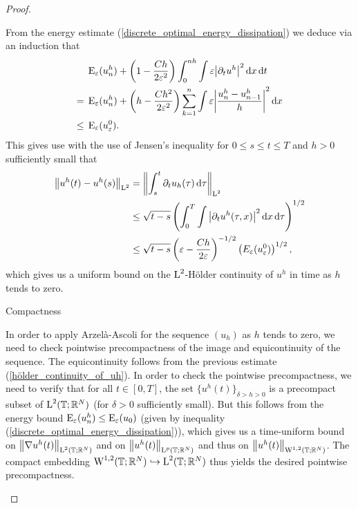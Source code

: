 \begin{proof}
\begin{description}[wide=0pt]
	From the energy estimate (\ref{discrete_optimal_energy_dissipation}) we deduce via an induction that
	\begin{align}
		& \operatorname{E}_{ \varepsilon } ( u_{ n }^{ h } )
		+
		\left(
			1
			-
			\frac{ C h  }{ 2 \varepsilon^{ 2 } }
		\right)
		\int_{ 0 }^{ n h }
			\int
				\varepsilon
				\abs{ \partial_{ t } u^{ h } }^{ 2 }
			\dd{ x }
		\dd{ t }
		\notag
		\\
		={} &
		\operatorname{E}_{ \varepsilon } ( u_{ n }^{ h } )
		+
		\left(
			h - \frac{ C h^{ 2 }}{ 2 \varepsilon^{ 2 } }
		\right)
		\sum_{k = 1 }^{ n }
			\int
				\varepsilon
				\abs{
				 	\frac{ u_{ n }^{ h } - u_{ n - 1 }^{ h } }{ h }
			 	}^{ 2 }
		 	\dd{ x }
		 \notag
		\\
		\label{energy_and_time_derivative_bound}
		\leq {} &
		\operatorname{E}_{ \varepsilon } ( u_{ \varepsilon }^{ 0 } ).
	\end{align}
	This gives use with the use of Jensen's inequality for $ 0\leq s \leq t \leq T $ and $ h > 0 $ sufficiently small that
	\begin{align}
		\norm{ u^{ h } ( t ) - u^{ h } ( s ) }_{ \operatorname{L}^{ 2 } }
		& =
		\norm{ 
			\int_{ s }^{ t }
				\partial_{ t } u_{ h } ( \tau )
			\dd{ \tau }
		}_{ \operatorname{L}^{ 2 } }
		\notag
		\\
		& \leq
		\sqrt{ t - s }
		\left(	
			\int_{ 0 }^{ T }
					\int
						\abs{ \partial_{ t } u^{ h } ( \tau, x ) }^{ 2 }
					\dd{ x }
				\dd{ \tau }
		\right)^{ 1/2 }
		\notag
		\\
		\label{hölder_continuity_of_uh}
		& \leq
		\sqrt{ t - s }
		\left(
			\varepsilon - \frac{ C h }{ 2 \varepsilon }
		\right)^{ - 1/2 }
		\left(  E_{ \varepsilon } ( u_{ \varepsilon }^{ 0 } ) \right)^{ 1/ 2 },
	\end{align}
	which gives us a uniform bound on the $ \operatorname{L}^{ 2 }$-Hölder continuity of $ u^{ h } $ in time as $ h $ tends to zero.
	
	\item[Step 5:] Compactness
	
	In order to apply Arzelà-Ascoli for the sequence $ (u_{ h } ) $ as $ h $ tends to zero, we need to check pointwise precompactness of the image and equicontinuity of the sequence. 
	The equicontinuity follows from the previous estimate (\ref{hölder_continuity_of_uh}).
	In order to check the pointwise precompactness, we need to verify that for all $ t \in [ 0 , T ] $, the set
	$ \{ u^{ h } ( t ) \}_{ \delta > h > 0 } $ is a precompact subset of $ \operatorname{L}^{ 2 } ( \operatorname{\mathbb{T}} ; \mathbb{ R }^{ N } ) $ (for $ \delta > 0 $ sufficiently small). 
	But this follows from the energy bound $ \operatorname{E}_{ \varepsilon } ( u_{ n }^{ h } ) \leq \operatorname{E}_{ \varepsilon } ( u_{ 0 } ) $ (given by inequality (\ref{discrete_optimal_energy_dissipation})), which gives us a time-uniform bound on $ \norm{ \nabla u^{ h }( t ) }_{\operatorname{L}^{ 2 }( \operatorname{\mathbb{T}}; \mathbb{ R }^{ N } ) } $ and on $ \norm{ u^{ h } ( t )}_{ \operatorname{L}^{ p } ( \operatorname{\mathbb{T}}; \mathbb{ R }^{ N } ) } $ and thus on $ \norm{ u^{ h } ( t )}_{ \operatorname{W}^{ 1 , 2 } ( \operatorname{\mathbb{T}}; \mathbb{ R }^{ N } ) } $. The compact embedding
	$ \operatorname{W}^{ 1 , 2 } ( \operatorname{\mathbb{T}} ; \mathbb{ R }^{ N } ) \hookrightarrow \operatorname{L}^{ 2 } ( \operatorname{\mathbb{T}}; \mathbb{ R }^{ N } ) $ thus yields the desired pointwise precompactness.
	

\end{description}
\end{proof}
